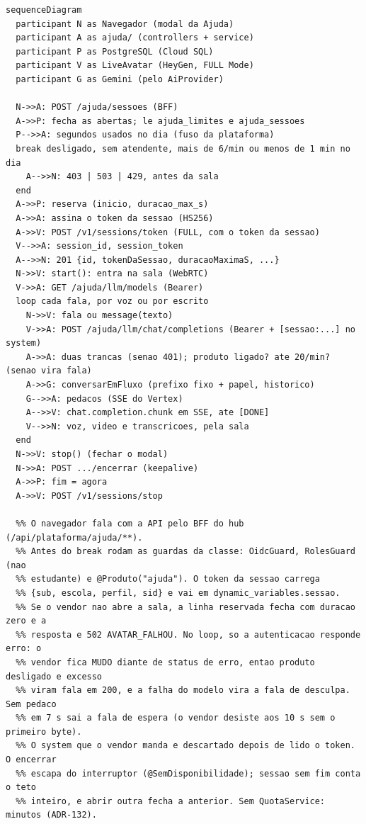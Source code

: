 \begin{lstlisting}[language=mermaid]
sequenceDiagram
  participant N as Navegador (modal da Ajuda)
  participant A as ajuda/ (controllers + service)
  participant P as PostgreSQL (Cloud SQL)
  participant V as LiveAvatar (HeyGen, FULL Mode)
  participant G as Gemini (pelo AiProvider)

  N->>A: POST /ajuda/sessoes (BFF)
  A->>P: fecha as abertas; le ajuda_limites e ajuda_sessoes
  P-->>A: segundos usados no dia (fuso da plataforma)
  break desligado, sem atendente, mais de 6/min ou menos de 1 min no dia
    A-->>N: 403 | 503 | 429, antes da sala
  end
  A->>P: reserva (inicio, duracao_max_s)
  A->>A: assina o token da sessao (HS256)
  A->>V: POST /v1/sessions/token (FULL, com o token da sessao)
  V-->>A: session_id, session_token
  A-->>N: 201 {id, tokenDaSessao, duracaoMaximaS, ...}
  N->>V: start(): entra na sala (WebRTC)
  V->>A: GET /ajuda/llm/models (Bearer)
  loop cada fala, por voz ou por escrito
    N->>V: fala ou message(texto)
    V->>A: POST /ajuda/llm/chat/completions (Bearer + [sessao:...] no system)
    A->>A: duas trancas (senao 401); produto ligado? ate 20/min? (senao vira fala)
    A->>G: conversarEmFluxo (prefixo fixo + papel, historico)
    G-->>A: pedacos (SSE do Vertex)
    A-->>V: chat.completion.chunk em SSE, ate [DONE]
    V-->>N: voz, video e transcricoes, pela sala
  end
  N->>V: stop() (fechar o modal)
  N->>A: POST .../encerrar (keepalive)
  A->>P: fim = agora
  A->>V: POST /v1/sessions/stop

  %% O navegador fala com a API pelo BFF do hub (/api/plataforma/ajuda/**).
  %% Antes do break rodam as guardas da classe: OidcGuard, RolesGuard (nao
  %% estudante) e @Produto("ajuda"). O token da sessao carrega
  %% {sub, escola, perfil, sid} e vai em dynamic_variables.sessao.
  %% Se o vendor nao abre a sala, a linha reservada fecha com duracao zero e a
  %% resposta e 502 AVATAR_FALHOU. No loop, so a autenticacao responde erro: o
  %% vendor fica MUDO diante de status de erro, entao produto desligado e excesso
  %% viram fala em 200, e a falha do modelo vira a fala de desculpa. Sem pedaco
  %% em 7 s sai a fala de espera (o vendor desiste aos 10 s sem o primeiro byte).
  %% O system que o vendor manda e descartado depois de lido o token. O encerrar
  %% escapa do interruptor (@SemDisponibilidade); sessao sem fim conta o teto
  %% inteiro, e abrir outra fecha a anterior. Sem QuotaService: minutos (ADR-132).
\end{lstlisting}

